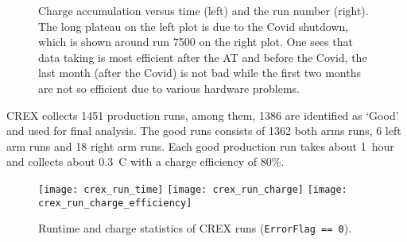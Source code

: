 \begin{figure}[!h]
    \caption{Charge accumulation versus time (left) and the run number (right). The
    long plateau on the left plot is due to the Covid shutdown, which is shown around
    run 7500 on the right plot. One sees that data taking is most efficient after
    the AT and before the Covid, the last month (after the Covid) is not bad while the 
    first two months are not so efficient due to various hardware problems.}
\end{figure}

CREX collects 1451 production runs, among them, 1386 are identified as `Good'
and used for final analysis. The good runs consists of 1362 both arms runs,
6 left arm runs and 18 right arm runs. Each good production run takes about 1~hour
and collects about 0.3~C with a charge efficiency of 80\%.
\begin{figure}[!h]
    \texttt{[image: crex\_run\_time]}
    \texttt{[image: crex\_run\_charge]}
    \texttt{[image: crex\_run\_charge\_efficiency]}
    \caption{Runtime and charge statistics of CREX runs (\texttt{ErrorFlag == 0}).}
\end{figure}


